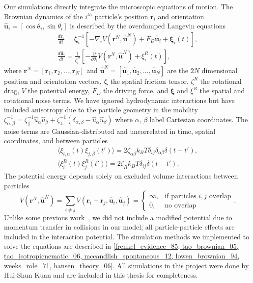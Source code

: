 Our simulations directly integrate the microscopic equations of motion.  The
Brownian dynamics of the $i^{th}$ particle's position $\bm{r}_i$ and orientation
$ \hat{ \bm{u} }_i = [ \cos \theta_i, \sin \theta_i ] $ is described by the
overdamped Langevin equations
\begin{gather}
  \label{eqn:lang_pos}
  \frac{d \bm{r}_i}{dt} = \boldsymbol{\zeta}_{i}^{-1} 
  \left[ -\nabla_i V(\bm{r}^{N}, \hat{\bm{u}}^{N} ) 
  + F_D \hat{\bm{u}}_{i} + \bm{\xi}_i(t) \right],\\
  \label{eqn:lang_or}
  \frac{d \hat{\bm{u}}_i}{dt} = \frac{1}{\zeta_i^{R}} 
  \left[ -\frac{\partial}{\partial \theta_i}
  V(\bm{r}^{N}, \hat{\bm{u}}^{N} ) + \xi^R_i(t) \right],
\end{gather}
%
where $ \bm{r}^{N} = [\bm{r}_1, \bm{r}_2, \ldots, \bm{r}_N ] $ and $
\hat{\bm{u}}^{N} = [ \hat{\bm{u}}_1, \hat{\bm{u}}_2, \ldots,\hat{\bm{u}}_N] $
are the $2N$ dimensional position and orientation vectors, $\bm{\zeta}$ the
spatial friction tensor, $\zeta^{R}$ the rotational drag, $V$ the potential
energy, $F_D$ the driving force, and $\bm{\xi}$ and $\xi^R$ the spatial and
rotational noise terms. We have ignored hydrodynamic interactions but have
included anisotropy due to the particle geometry in the mobility $
\zeta^{-1}_{\alpha,\beta} = \zeta^{-1}_{\parallel} \hat{u}_{\alpha}
\hat{u}_{\beta} + \zeta^{-1}_{\perp} (\delta_{\alpha,\beta} - \hat{u}_{\alpha}
\hat{u}_{\beta} ) $ where $\alpha$, $\beta$ label Cartesian coordinates. The
noise terms are Gaussian-distributed and uncorrelated in time, spatial
coordinates, and between particles
\begin{gather}
  \langle \xi_{i,\alpha}( t ) \xi_{j,\beta} ( t') \rangle = 
  2 \zeta_{\alpha \beta}  k_B T \delta_{i j} 
  \delta_{\alpha \beta} \delta(t-t'), \\
  \langle \xi_{i}^{R}(t) \xi_{j}^{R} ( t') \rangle = 2 \zeta_{R} 
  k_B T \delta_{i j} \delta(t-t').
\end{gather}
%
The potential energy depends solely on excluded volume
interactions between particles
%
\begin{equation}
  V(\bm{r}^{N}, \hat{\bm{u}}^{N} ) = 
  \sum_{i \neq j } 
  V(\bm{r}_i - \bm{r}_j,\hat{\bm{u}}_{i}, \hat{\bm{u}}_{j} ) = 
  \begin{cases}
    \infty , & \text{if particles $i,j$ overlap} \\
    0 , & \text{no overlap} 
  \end{cases}.
\end{equation}
%
Unlike some previous work~\cite{baskaran_enhanced_08,
  baskaran_nonequilibrium_10, baskaran_selfregulation_12}, we did not include a
modified potential due to momentum transfer in collisions in our model; all
particle-particle effects are included in the interaction potential.  The
simulation methods we implemented to solve the equations are described in
\cref{frenkel_evidence_85, tao_brownian_05, tao_isotropicnematic_06,
  mccandlish_spontaneous_12, lowen_brownian_94, weeks_role_71,
  hansen_theory_06}.  All simulations in this project were done by Hui-Shun Kuan
and are included in this thesis for completeness.

